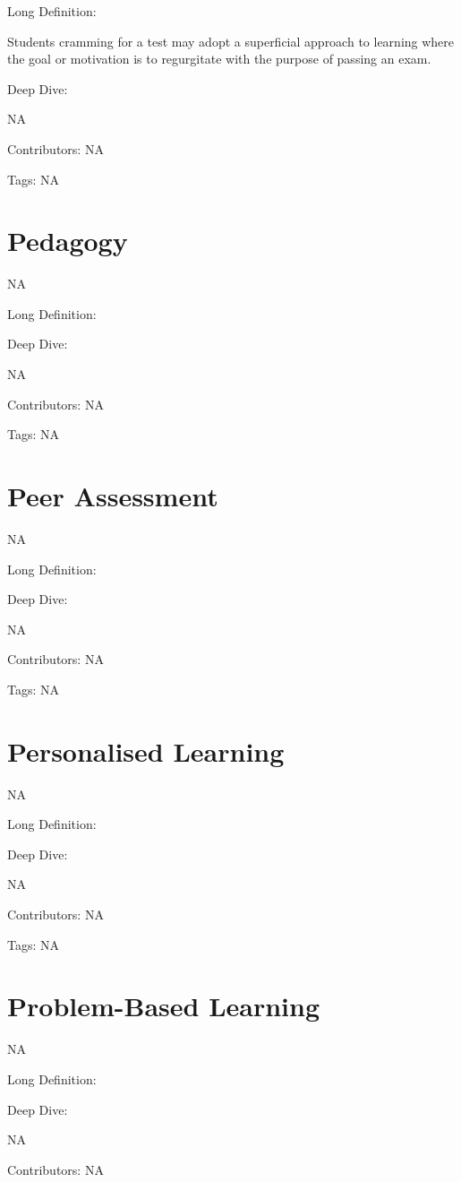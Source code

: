 \documentclass[
  letterpaper,
  DIV=11,
  numbers=noendperiod]{scrreprt}
\begin{document}
Long Definition:

Students cramming for a test may adopt a superficial approach to
learning where the goal or motivation is to regurgitate with the purpose
of passing an exam.

Deep Dive:

NA

Contributors: NA

Tags: NA

\section{Pedagogy}\label{pedagogy}

NA

Long Definition:

Deep Dive:

NA

Contributors: NA

Tags: NA

\section{Peer Assessment}\label{peer-assessment}

NA

Long Definition:

Deep Dive:

NA

Contributors: NA

Tags: NA

\section{Personalised Learning}\label{personalised-learning}

NA

Long Definition:

Deep Dive:

NA

Contributors: NA

Tags: NA

\section{Problem-Based Learning}\label{problem-based-learning}

NA

Long Definition:

Deep Dive:

NA

Contributors: NA
\end{document}
